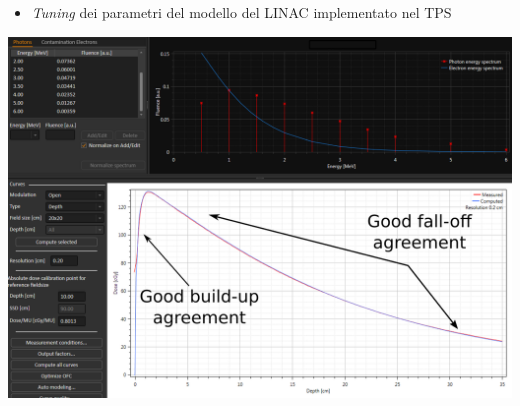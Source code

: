 \documentclass{beamer}
\begin{document}
\begin{frame}{}
\thispagestyle{empty}
\begin{itemize}
\scriptsize
{}
\item \alert{\textit{Tuning} dei parametri del modello del LINAC implementato nel TPS}
\end{itemize}
\centering
\includegraphics[width=1.2\textwidth]{./img/pddmodel3.PNG}
\end{frame}
\end{document}
